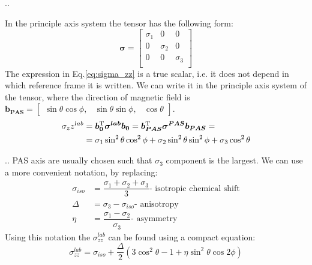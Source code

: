 \documentclass{beamer}
\begin{document}
\begin{frame}{\thesection.\thesubsection. \insertsubsection}

   In the principle axis system the tensor has the following form:
   \begin{equation}
     \bm{\sigma}=
      \begin{bmatrix}
  	\sigma_{1} & 0 & 0 \\
  	0 & \sigma_{2} & 0 \\
  	0 & 0 & \sigma_{3} \\
  \end{bmatrix}    
   \end{equation}
   The expression in Eq.\ref{eq:sigma_zz} is a true scalar, i.e. it does not depend in which reference frame it is written. We can write it in the principle axis system of the tensor, where the direction of magnetic field is $\bm{b_{PAS}} = \begin{bmatrix} \sin \theta \cos \phi, & \sin \theta \sin \phi,   & \cos \theta \end{bmatrix}  $.
   \begin{align}
      \sigma_zz^{lab} &= \bm{b_0}^{\rm T} \bm{\sigma^{lab}} \bm{b_0} = \bm{b_{PAS}}^{\rm T} \bm{\sigma^{PAS}} \bm{b_{PAS}} = \\
      &= \sigma_1 \sin^2 \theta \cos^2 \phi + \sigma_2 \sin^2 \theta \sin^2 \phi + \sigma_3 \cos^2 \theta 
   \end{align}

\end{frame}   
\begin{frame}{\thesection.\thesubsection. \insertsubsection}
    PAS axis are usually chosen such that  $\sigma_3$ component is the largest. We can use a more convenient notation, by replacing:
    \begin{align}
       \sigma_{iso} &= \dfrac{\sigma_1  + \sigma_2 + \sigma_3}{3}  \text{- isotropic chemical shift} \\
       \Delta &= \sigma_3 - \sigma_{iso} \text{- anisotropy} \\
       \eta &= \dfrac{\sigma_1 - \sigma_2}{\sigma_3} \text{- asymmetry}
    \end{align}
    Using this notation the $\sigma_{zz}^{lab}$ can be found using a compact equation:
    \begin{equation}
       \sigma_{zz}^{lab} = \sigma_{iso} + \dfrac{\Delta}{2}(3 \cos^2 \theta -1 + \eta \sin^2 \theta \cos 2 \phi)
    \end{equation}
\end{frame}
\end{document}
